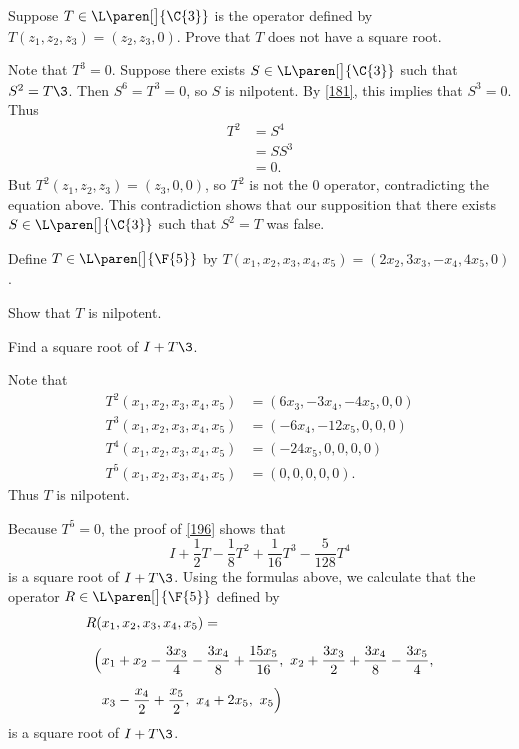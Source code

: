 
\exercise
Suppose $T \in \L\paren[\big]{\C{3}}$ is the operator defined by $T(z_1, z_2, z_3) = (z_2, z_3, 0)$.  Prove
that $T$ does not have a square root.\label{195}

\begin{Solution}
Note that $T^3 = 0$.  Suppose there exists $S \in \L\paren[\big]{\C{3}}$ such that $S^2 = T\3$.
Then $S^6 = T^3 = 0$, so $S$ is nilpotent.  By \ref{181}, this implies that
$S^3 = 0$.  Thus
\begin{align*}
T^2 &= S^4 \\
&= SS^3 \\
&= 0.
\end{align*}
But $T^2(z_1, z_2, z_3) = (z_3, 0, 0)$, so $T^2$ is not the $0$ operator,
contradicting the equation above.  This contradiction shows that our supposition
that there exists $S \in \L\paren[\big]{\C{3}}$ such that $S^2 = T$ was false.
\end{Solution}

\exercise
Define $T \in \L\paren[\big]{\F{5}}$ by
$T(x_1, x_2, x_3, x_4, x_5) = (2 x_2, 3 x_3, -x_4, 4 x_5, 0)$.
\begin{subtheorem}
\item
Show that $T$ is nilpotent.
\item
Find a square root of $I + T\3$.
\end{subtheorem}

\begin{Solution}
\begin{subtheorem}
\item
Note that
\begin{align*}
T^2(x_1, x_2, x_3, x_4, x_5) &= (6x_3, -3x_4, -4x_5, 0, 0) \\
T^3(x_1, x_2, x_3, x_4, x_5) &= (-6x_4, -12x_5, 0, 0, 0) \\
T^4(x_1, x_2, x_3, x_4, x_5) &=(-24x_5, 0, 0, 0, 0) \\
T^5(x_1, x_2, x_3, x_4, x_5) &= (0,0,0,0,0).
\end{align*}
Thus $T$ is nilpotent.

\item
Because $T^5 = 0$, the proof of \ref{196} shows that
\[
I + \frac{1}{2}T - \frac{1}{8}T^2 + \frac{1}{16}T^3 - \frac{5}{128}T^4
\]
is a square root of $I + T\3$.  Using the formulas above, we calculate that the
operator $R \in \L\paren[\big]{\F{5}}$ defined by
\begin{align*}
R(&x_1, x_2, x_3, x_4, x_5) = \\[6bp]
\Bigl(
&x_1 + x_2 - \frac{3 x_3}{4} - \frac{3 x_4}{8} + \frac{15 x_5}{16}, \
x_2 + \frac{3 x_3}{2}  + \frac{3 x_4}{8} - \frac{3 x_5}{4}, \\[6bp]
&x_3 - \frac{x_4}{2} + \frac{x_5}{2}, \
x_4 + 2 x_5, \
x_5
\Bigr)
\end{align*}
is a square root of $I + T\3$.
\end{subtheorem}
\end{Solution}

